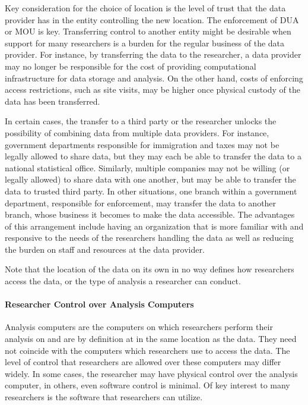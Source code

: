 Key consideration for the choice of location is the level of trust that
the data provider has in the entity controlling the new location. The
enforcement of DUA or MOU is key. Transferring control to another entity
might be desirable when support for many researchers is a burden for the
regular business of the data provider. For instance, by transferring the
data to the researcher, a data provider may no longer be responsible for
the cost of providing computational infrastructure for data storage and
analysis. On the other hand, costs of enforcing access restrictions,
such as site visits, may be higher once physical custody of the data has
been transferred.

In certain cases, the transfer to a third party or the researcher
unlocks the possibility of combining data from multiple data providers.
For instance, government departments responsible for immigration and
taxes may not be legally allowed to share data, but they may each be
able to transfer the data to a national statistical office. Similarly,
multiple companies may not be willing (or legally allowed) to share data
with one another, but may be able to transfer the data to trusted third
party. In other situations, one branch within a government department,
responsible for enforcement, may transfer the data to another branch,
whose business it becomes to make the data accessible. The advantages of
this arrangement include having an organization that is more familiar
with and responsive to the needs of the researchers handling the data as
well as reducing the burden on staff and resources at the data provider.

Note that the location of the data on its own in no way defines how
researchers access the data, or the type of analysis a researcher can
conduct.

\hypertarget{researcher-control-over-analysis-computers}{%
\paragraph{Researcher Control over Analysis
Computers}\label{researcher-control-over-analysis-computers}}

Analysis computers are the computers on which researchers perform their
analysis on and are by definition at in the same location as the data.
They need not coincide with the computers which researchers use to
access the data. The level of control that researchers are allowed over
these computers may differ widely. In some cases, the researcher may
have physical control over the analysis computer, in others, even
software control is minimal. Of key interest to many researchers is the
software that researchers can utilize.

